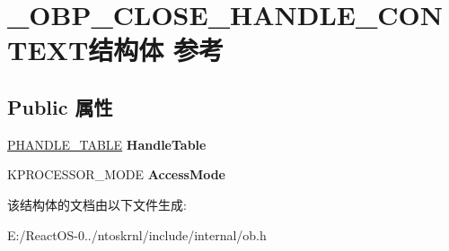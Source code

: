 \hypertarget{struct___o_b_p___c_l_o_s_e___h_a_n_d_l_e___c_o_n_t_e_x_t}{}\section{\+\_\+\+O\+B\+P\+\_\+\+C\+L\+O\+S\+E\+\_\+\+H\+A\+N\+D\+L\+E\+\_\+\+C\+O\+N\+T\+E\+X\+T结构体 参考}
\label{struct___o_b_p___c_l_o_s_e___h_a_n_d_l_e___c_o_n_t_e_x_t}
\subsection*{Public 属性}
\begin{DoxyCompactItemize}
\item 
\mbox{\label{struct___o_b_p___c_l_o_s_e___h_a_n_d_l_e___c_o_n_t_e_x_t_a3c2358a3280de4f3dcb95b2b1c94a766}} 
\hyperlink{struct___h_a_n_d_l_e___t_a_b_l_e}{P\+H\+A\+N\+D\+L\+E\+\_\+\+T\+A\+B\+LE} {\bfseries Handle\+Table}
\item 
\mbox{\label{struct___o_b_p___c_l_o_s_e___h_a_n_d_l_e___c_o_n_t_e_x_t_ac58294cf5ca8bd0832e9f0c975dda5fe}} 
K\+P\+R\+O\+C\+E\+S\+S\+O\+R\+\_\+\+M\+O\+DE {\bfseries Access\+Mode}
\end{DoxyCompactItemize}


该结构体的文档由以下文件生成\+:\begin{DoxyCompactItemize}
\item 
E\+:/\+React\+O\+S-\/0../ntoskrnl/include/internal/ob.\+h\end{DoxyCompactItemize}
